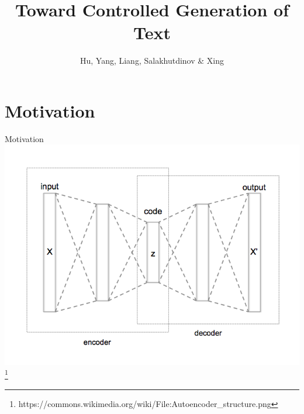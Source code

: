 \documentclass{beamer}
\title{Toward Controlled Generation of Text}
\date{}
\author{Hu, Yang, Liang, Salakhutdinov \& Xing}
\institute{ICML 2017}
\begin{document}
\maketitle

\section{Motivation}

\begin{frame}{Motivation}
	\centering
	\includegraphics[width=.9\textwidth]{images/autoencoder.png}
	{\tiny \footnote{https://commons.wikimedia.org/wiki/File:Autoencoder\_structure.png}}
\end{frame}
\end{document}
